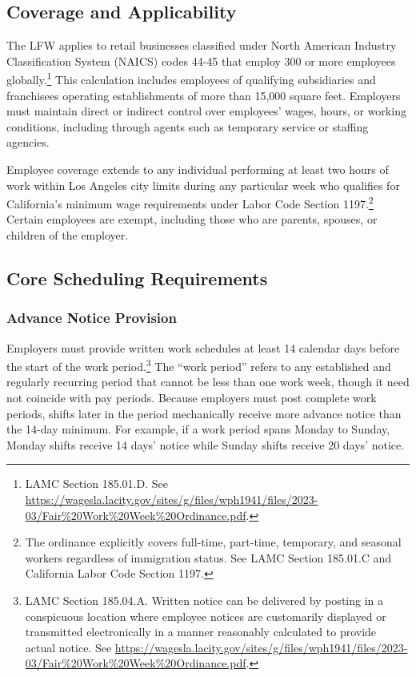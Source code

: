 \documentclass[letterpaper,11pt,leqno]{article}
\theoremstyle{paper}
\begin{document}
\subsection{Coverage and Applicability}

The LFW applies to retail businesses classified under North American Industry Classification System (NAICS) codes 44-45 that employ 300 or more employees globally.\footnote{LAMC Section 185.01.D. See \url{https://wagesla.lacity.gov/sites/g/files/wph1941/files/2023-03/Fair\%20Work\%20Week\%20Ordinance.pdf}.} This calculation includes employees of qualifying subsidiaries and franchisees operating establishments of more than 15,000 square feet. Employers must maintain direct or indirect control over employees' wages, hours, or working conditions, including through agents such as temporary service or staffing agencies.

Employee coverage extends to any individual performing at least two hours of work within Los Angeles city limits during any particular week who qualifies for California's minimum wage requirements under Labor Code Section 1197.\footnote{The ordinance explicitly covers full-time, part-time, temporary, and seasonal workers regardless of immigration status. See LAMC Section 185.01.C and California Labor Code Section 1197.} Certain employees are exempt, including those who are parents, spouses, or children of the employer.

\subsection{Core Scheduling Requirements}

\subsubsection{Advance Notice Provision}
Employers must provide written work schedules at least 14 calendar days before the start of the work period.\footnote{LAMC Section 185.04.A. Written notice can be delivered by posting in a conspicuous location where employee notices are customarily displayed or transmitted electronically in a manner reasonably calculated to provide actual notice. See \url{https://wagesla.lacity.gov/sites/g/files/wph1941/files/2023-03/Fair\%20Work\%20Week\%20Ordinance.pdf}.} The ``work period'' refers to any established and regularly recurring period that cannot be less than one work week, though it need not coincide with pay periods. Because employers must post complete work periods, shifts later in the period mechanically receive more advance notice than the 14-day minimum. For example, if a work period spans Monday to Sunday, Monday shifts receive 14 days' notice while Sunday shifts receive 20 days' notice.
\end{document}
